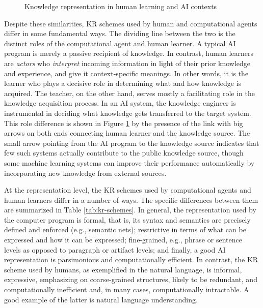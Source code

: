 \begin{figure}[htb]
  \caption{Knowledge representation in human learning and AI contexts}
  \label{fig:kr}
\end{figure}

Despite these similarities, KR schemes used by human and computational
agents differ in some fundamental ways. The dividing line between the two
is the distinct roles of the computational agent and human learner.  A
typical AI program is merely a passive recipient of knowledge.  In
contrast, human learners are {\it actors\/} who {\it interpret \/} incoming
information in light of their prior knowledge and experience, and give it
context-specific meanings. In other words, it is the learner who plays a
decisive role in determining what and how knowledge is acquired.  The
teacher, on the other hand, serves mostly a facilitating role in the
knowledge acquisition process. In an AI system, the knowledge engineer is
instrumental in deciding what knowledge gets transferred to the target
system. This role difference is shown in Figure \ref{fig:kr} by the
presence of the link with big arrows on both ends connecting human learner
and the knowledge source.  The small arrow pointing from the AI program to
the knowledge source indicates that few such systems actually contribute to
the public knowledge source, though some machine learning systems can
improve their performance automatically by incorporating new knowledge from
external sources.

At the representation level, the KR schemes used by computational agents
and human learners differ in a number of ways. The specific differences
between them are summarized in Table \ref{tab:kr-schemes}. In general, the
representation used by the computer program is formal, that is, its syntax
and semantics are precisely defined and enforced (e.g., semantic nets);
restrictive in terms of what can be expressed and how it can be expressed;
fine-grained, e.g., phrase or sentence levels as opposed to paragraph or
artifact levels; and finally, a good AI representation is parsimonious and
computationally efficient. In contrast, the KR scheme used by humans, as
exemplified in the natural language, is informal, expressive, emphasizing
on coarse-grained structures, likely to be redundant, and computationally
inefficient and, in many cases, computationally intractable. A good example
of the latter is natural language understanding.


